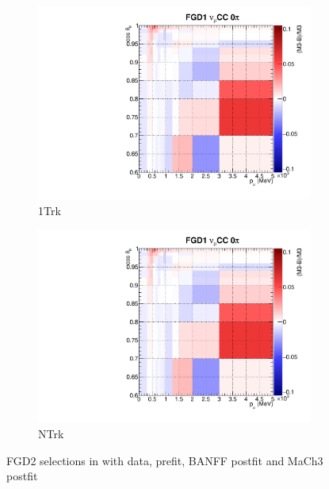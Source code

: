 \begin{figure}
\begin{subfigure}[t]{0.24\textwidth}
		\includegraphics[width=\textwidth, trim={0mm 0mm 10mm 7mm}, clip, page=39]{figures/mach3/banff/postfit_comp}
		\caption{\numu 1Trk}
	\end{subfigure}
	\begin{subfigure}[t]{0.24\textwidth}
		\includegraphics[width=\textwidth, trim={0mm 0mm 10mm 7mm}, clip, page=42]{figures/mach3/banff/postfit_comp}
		\caption{\numu NTrk}
	\end{subfigure}
	\caption{FGD2 selections in \pmu with data, prefit, BANFF postfit and MaCh3 postfit}
	\label{fig:mach3_banff_postfit_fgd2}
\end{figure}